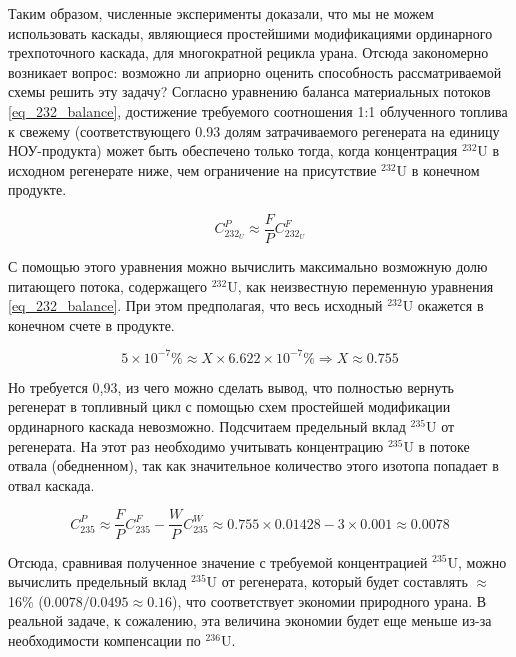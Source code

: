Таким образом, численные эксперименты доказали, что мы не можем использовать каскады, являющиеся простейшими модификациями ординарного трехпоточного каскада, для многократной рецикла урана. Отсюда закономерно возникает вопрос: возможно ли априорно оценить способность рассматриваемой схемы решить эту задачу? Согласно уравнению баланса материальных потоков \ref{eq_232_balance}, достижение требуемого соотношения 1:1 облученного топлива к свежему (соответствующего 0.93 долям затрачиваемого регенерата на единицу НОУ-продукта) может быть обеспечено только тогда, когда концентрация $^{232}$U в исходном регенерате ниже, чем ограничение на присутствие $^{232}$U в конечном продукте.

\begin{equation}
\label{eq_232_balance}
  C_{232_{U}}^{P} \approx \frac{F}{P} C_{232_{U}}^{F}
\end{equation}

С помощью этого уравнения можно вычислить максимально возможную долю питающего потока, содержащего $^{232}$U, как неизвестную переменную уравнения \ref{eq_232_balance}. При этом предполагая, что весь исходный $^{232}$U окажется в конечном счете в продукте.

\begin{equation}
  \label{eq_232_balance_X}
    5 \times 10^{-7} \% \approx X \times 6.622 \times 10^{-7} \% \Rightarrow X \approx 0.755
\end{equation}

Но требуется 0,93, из чего можно сделать вывод, что полностью вернуть регенерат в топливный цикл с помощью схем простейшей модификации ординарного каскада невозможно.
Подсчитаем предельный вклад $^{235}$U от регенерата. На этот раз необходимо учитывать концентрацию $^{235}$U в потоке отвала (обедненном), так как значительное количество этого изотопа попадает в отвал каскада.

\begin{equation}
  \label{eq_235_balance_X}
    C_{235}^{P} \approx \frac{F}{P} C_{235}^{F}-\frac{W}{P} C_{235}^{W} \approx 0.755 \times 0.01428-3 \times 0.001 \approx 0.0078
\end{equation}

Отсюда, сравнивая полученное значение с требуемой концентрацией $^{235}$U, можно вычислить предельный вклад $^{235}$U от регенерата, который будет составлять $\approx$16\% ($0.0078/0.0495\approx0.16$), что соответствует экономии природного урана. В реальной задаче, к сожалению, эта величина экономии будет еще меньше из-за необходимости компенсации по $^{236}$U.

